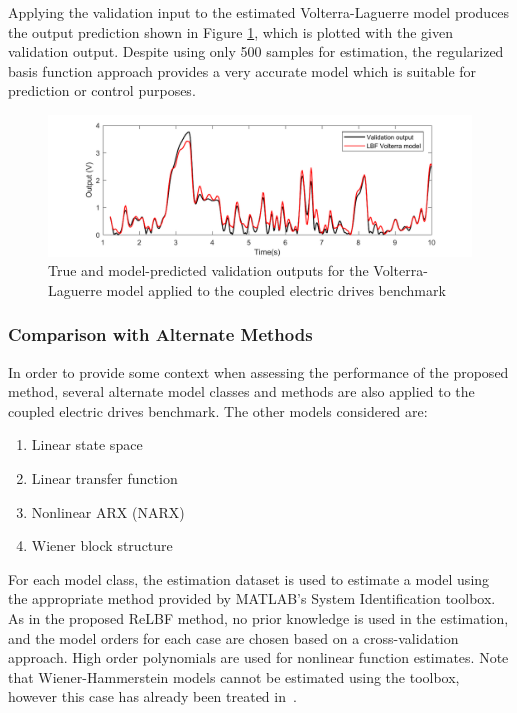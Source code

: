Applying the validation input to the estimated Volterra-Laguerre model produces the output prediction shown in Figure \ref{fig:ValidationLBFVK_CED}, which is plotted with the given validation output. Despite using only 500 samples for estimation, the regularized basis function approach provides a very accurate model which is suitable for prediction or control purposes. 

\begin{figure}[h]
\centering
\includegraphics[width=\textwidth]{Chapter6_CaseStudies/ValidationLBFVK_CED.pdf}
\caption{True and model-predicted validation outputs for the Volterra-Laguerre model applied to the coupled electric drives benchmark} \label{fig:ValidationLBFVK_CED}
\end{figure}

\subsubsection{Comparison with Alternate Methods }

In order to provide some context when assessing the performance of the proposed method, several alternate model classes and methods are also applied to the coupled electric drives benchmark. The other models considered are:
\begin{enumerate}
\item Linear state space 
\item Linear transfer function 
\item Nonlinear ARX (NARX) 
\item Wiener block structure
\end{enumerate}

For each model class, the estimation dataset is used to estimate a model using the appropriate method provided by MATLAB's System Identification toolbox. As in the proposed ReLBF method, no prior knowledge is used in the estimation, and the model orders for each case are chosen based on a cross-validation approach. High order polynomials are used for nonlinear function estimates. Note that Wiener-Hammerstein models cannot be estimated using the toolbox, however this case has already been treated in~\cite{Wigren2017}.

